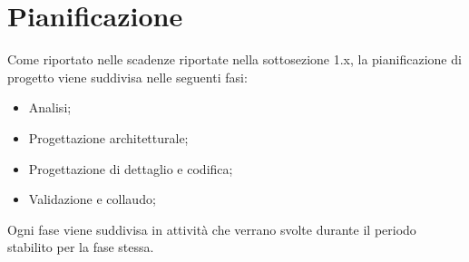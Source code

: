 \section{Pianificazione}
Come riportato nelle scadenze riportate nella sottosezione 1.x, la pianificazione di progetto viene suddivisa nelle seguenti fasi:
\begin{itemize}
	\item Analisi;
	\item Progettazione architetturale;
	\item Progettazione di dettaglio e codifica;
	\item Validazione e collaudo;
\end{itemize}
Ogni fase viene suddivisa in attività che verrano svolte durante il periodo stabilito per la fase stessa.

\newpage

\newpage

\newpage
